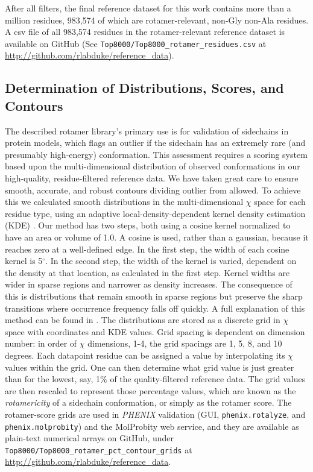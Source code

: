 After all filters, the final reference dataset for this work contains more than a million residues, 983,574 of which are rotamer-relevant, non-Gly non-Ala residues. A csv file of all 983,574 residues in the rotamer-relevant reference dataset is available on GitHub (See \texttt{Top8000/Top8000\_rotamer\_residues.csv} at \url{http://github.com/rlabduke/reference_data}).

\subsection{Determination of Distributions, Scores, and Contours}
\label{sec_md:contours}
The described rotamer library's primary use is for validation of sidechains in protein models, which flags an outlier if the sidechain has an extremely rare (and presumably high-energy) conformation. This assessment requires a scoring system based upon the multi-dimensional distribution of observed conformations in our high-quality, residue-filtered reference data. We have taken great care to ensure smooth, accurate, and robust contours dividing outlier from allowed. To achieve this we calculated smooth distributions in the multi-dimensional $\chi$ space for each residue type, using an adaptive local-density-dependent kernel density estimation (KDE) \textcolor{red}{\cite{Breiman1977}}. Our method has two steps, both using a cosine kernel normalized to have an area or volume of 1.0. A cosine is used, rather than a gaussian, because it reaches zero at a well-defined edge. In the first step, the width of each cosine kernel is 5$^{\circ}$. In the second step, the width of the kernel is varied, dependent on the density at that location, as calculated in the first step. Kernel widths are wider in sparse regions and narrower as density increases. The consequence of this is distributions that remain smooth in sparse regions but preserve the sharp transitions where occurrence frequency falls off quickly. A full explanation of this method can be found in \cite{Lovell:2003uq}. The distributions are stored as a discrete grid in $\chi$ space with coordinates and KDE values. Grid spacing is dependent on dimension number: in order of $\chi$ dimensions, 1-4, the grid spacings are 1, 5, 8, and 10 degrees. Each datapoint residue can be assigned a value by interpolating its $\chi$ values within the grid. One can then determine what grid value is just greater than for the lowest, say, 1\% of the quality-filtered reference data. The grid values are then rescaled to represent those percentage values, which are known as the \textit{rotamericity} of a sidechain conformation, or simply as the rotamer score. The rotamer-score grids are used in \textit{PHENIX} validation (GUI, \texttt{phenix.rotalyze}, and \texttt{phenix.molprobity}) and the MolProbity web service, and they are available as plain-text numerical arrays on GitHub, under \texttt{Top8000/Top8000\_rotamer\_pct\_contour\_grids} at \url{http://github.com/rlabduke/reference_data}.


